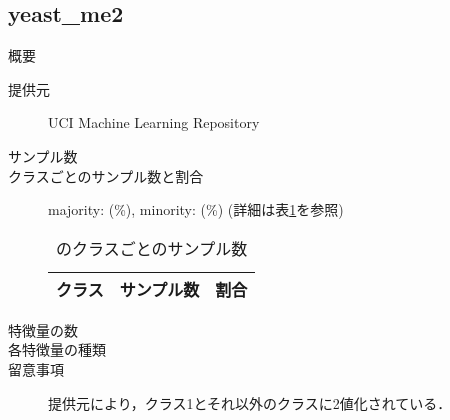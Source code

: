 \subsection{yeast\_me2}
\begin{description}
    \item[概要] \cite{}
    \item[提供元] UCI Machine Learning Repository
    \item[サンプル数] 
    \item[クラスごとのサンプル数と割合] majority:  (\%), minority:  (\%) (詳細は表\ref{tab:}を参照)

        \begin{table}
            \centering
            \caption{のクラスごとのサンプル数}
            \label{tab:}
            \begin{tabular}{lrc} \hline
                \multicolumn{1}{c}{クラス}&
                \multicolumn{1}{c}{サンプル数}&
                \multicolumn{1}{c}{割合}\\
                \hline
                \hline

                \hline
            \end{tabular}
        \end{table}

    \item[特徴量の数] 
    \item[各特徴量の種類] \mbox{}
        
    \item[留意事項] 提供元により，クラス1とそれ以外のクラスに2値化されている．
\end{description}


